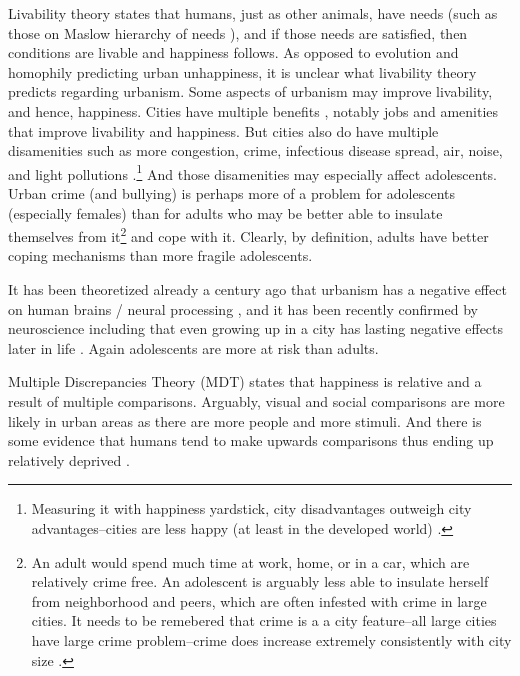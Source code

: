 \documentclass[10pt, letterpaper]{article}
\begin{document}
\begin{spacing}{1.4}
Livability theory \citep{veenhoven95,veenhoven14b,veenhoven00b} states that
humans, just as other animals, have needs (such as those on Maslow hierarchy of
needs \citep{maslow87}), and if those needs are satisfied, then conditions are
livable and happiness follows. As opposed to evolution and homophily
predicting urban unhappiness, it is unclear what livability theory
 predicts regarding urbanism. Some aspects of urbanism may
 improve livability, and hence, happiness.
 Cities have multiple benefits  \citep{meyer13,florida08,glaeser11,osullivan09}, notably jobs and amenities that improve livability and
 happiness. But cities also do have multiple disamenities such as more congestion, crime,
   infectious  disease spread, air, noise, and light pollutions
   \citep{bettencourt10b,bettencourt07,meyer13,aokCityBook15}.\footnote{Measuring
     it with happiness yardstick,  city disadvantages outweigh city
     advantages--cities are less happy (at least in the developed world)
     \citep{aok21}.} 
   And those disamenities may especially affect adolescents. Urban
 crime (and bullying) is perhaps more of a problem for adolescents (especially
 females) than for adults who may be better able to insulate themselves from
 it\footnote{An adult would spend much time at work, home, or in a
   car, which are relatively crime free. An adolescent is arguably less able to
   insulate herself from neighborhood and peers, which are often infested with
   crime in large cities. It needs to be remebered that crime is a a city
   feature--all large cities have large crime problem--crime  does increase
   extremely consistently with city size \cite{blissCL_nov4_14,bettencourt13,bettencourt10,bettencourt10b,bettencourt07}.}
 and cope with it. Clearly, by definition, adults have better coping mechanisms
 than more fragile adolescents. 

 It has been theoretized already a century ago that urbanism has a negative
 effect on human brains / neural processing \citep{simmel03}, and it has been
 recently confirmed by neuroscience including that even growing up in a city has
 lasting negative effects later in life \citep{lederbogen11}. Again adolescents
 are more at risk than adults. 
   
   Multiple Discrepancies Theory (MDT) \citep{michalos85,michalos14c} states that
happiness is relative and a result of multiple comparisons. Arguably, visual and social comparisons are more likely in
urban areas as there are more people and more stimuli. And there is some
evidence that humans tend to make upwards comparisons \citep{frey02s} thus
ending up relatively deprived \citep[e.g.,][]{luttmer05,frank12}.


\end{spacing}
\end{document}
